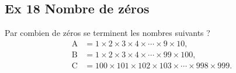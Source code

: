 \documentclass[a4paper,11pt]{article}
\begin{document}
\bigskip

\subsection*{Ex 18 \; Nombre de zéros}
Par combien de zéros se terminent les nombres suivants ?
\[
\begin{aligned}
\mathrm{A}&=1\times 2\times 3\times 4\times \cdots \times 9\times 10,\\
\mathrm{B}&=1\times 2\times 3\times 4\times \cdots \times 99\times 100,\\
\mathrm{C}&=100\times 101\times 102\times 103\times \cdots \times 998\times 999.
\end{aligned}
\]
\end{document}
